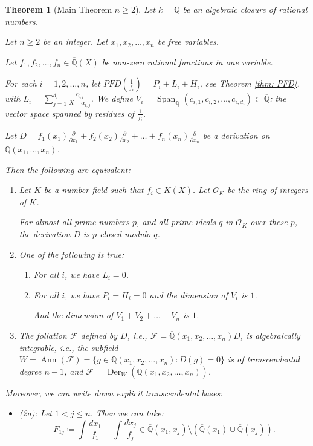 \documentclass{amsart}
\newcommand{\cO}{\mathcal{O}}
\newcommand{\F}{\mathcal{F}}
\newcommand{\op}{\operatorname}
\newtheorem{thm}{Theorem}[section]
\theoremstyle{definition}
\begin{document}
\begin{thm}[Main Theorem $n\ge 2$]\label{thm: main theorem n>=2}
    Let $k=\overline{\mathbb{Q}}$ be an algebraic closure of rational numbers.

Let $n\ge 2$ be an integer.
Let $x_1,x_2,\ldots, x_n$ be free variables.

Let $f_1,f_2,\ldots,f_n \in \overline{\mathbb{Q}}(X)$ be non-zero rational functions in one variable.

For each $i=1,2,\ldots,n$, let $PFD(\frac{1}{f_i})=P_i+L_i+H_i$, see Theorem \ref{thm: PFD}, with $L_i=\sum_{j=1}^{d_i}\frac{c_{i,j}}{X-\alpha_{i,j}}$. We define $V_i=\op{Span}_\mathbb{Q}(c_{i,1},c_{i,2},\ldots,c_{i,d_i})\subset \overline{\mathbb{Q}}$: the vector space spanned by residues of $\frac{1}{f_i}$.

Let $D=
f_1(x_1)\frac{\partial}{\partial x_1}+f_2(x_2)\frac{\partial}{\partial x_2}+\ldots+f_n(x_n)\frac{\partial}{\partial x_n}$ be a derivation on $\overline{\mathbb{Q}}(x_1,\ldots,x_n)$.



Then the following are equivalent:
\begin{enumerate}
    \item Let $K$ be a number field such that $f_i \in K(X)$. Let $\cO_K$ be the ring of integers of $K$.
    
    For almost all prime numbers $p$, and all prime ideals $q$ in $\cO_K$ over these $p$, the derivation $D$ is $p$-closed modulo $q$.
    \item One of the following is true:
    \begin{enumerate}
        \item For all $i$, we have $L_i=0$.
        \item For all $i$, we have $P_i=H_i=0$ and the dimension of $V_i$ is $1$. 
        
        And the dimension of $V_1+V_2+\ldots+V_n$ is $1$.
    \end{enumerate}
    \item The foliation $\F$ defined by $D$, i.e., $\F=\overline{\mathbb{Q}}(x_1,x_2,\ldots,x_n)D$, is algebraically integrable, i.e., the subfield
    $W=\op{Ann}(\F)=\{g\in \overline{\mathbb{Q}}(x_1,x_2,\ldots,x_n): D(g)=0\}$ is of transcendental degree $n-1$, and $\F=\op{Der}_W(\overline{\mathbb{Q}}(x_1,x_2,\ldots,x_n))$.
\end{enumerate}

Moreover, we can write down explicit transcendental bases:
\begin{itemize}
    \item (2a): Let $1<j\le n$. Then we can take:
        \begin{equation}
            F_{1j}\coloneqq \int \frac{dx_1}{f_1}-\int \frac{dx_j}{f_j} \in \overline{\mathbb{Q}}(x_1,x_j)\setminus \left(\overline{\mathbb{Q}}(x_1)\cup \overline{\mathbb{Q}}(x_j)\right).
        \end{equation}
        

\end{itemize}
\end{thm}
\end{document}
